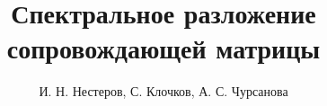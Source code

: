 \documentclass[10pt,a4paper,oneside]{article}
\begin{document}
 
\title{Спектральное разложение сопровождающей матрицы}
\author{И. Н. Нестеров, С. Клочков, А. С. Чурсанова}

\makemytitle



\cite{baskakov}


\end{document}
